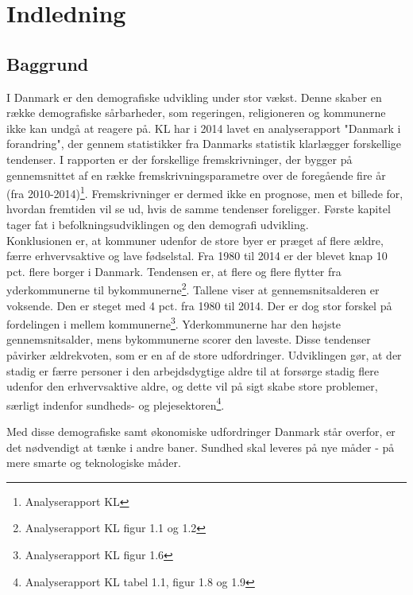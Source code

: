 \chapter{Indledning}

\section{Baggrund}
I Danmark er den demografiske udvikling under stor vækst. Denne skaber en række demografiske sårbarheder, som regeringen, religioneren og kommunerne ikke kan undgå at reagere på. KL har i 2014 lavet en analyserapport "Danmark i forandring", der gennem statistikker fra Danmarks statistik klarlægger forskellige tendenser. I rapporten er der forskellige fremskrivninger, der bygger på gennemsnittet af en række fremskrivningsparametre over de foregående fire år (fra 2010-2014)\footnote{Analyserapport KL}. Fremskrivninger er dermed ikke en prognose, men et billede for, hvordan fremtiden vil se ud, hvis de samme tendenser foreligger. Første kapitel tager fat i befolkningsudviklingen og den demografi udvikling. \\
Konklusionen er, at kommuner udenfor de store byer er præget af flere ældre, færre erhvervsaktive og lave fødselstal. Fra 1980 til 2014 er der blevet knap 10 pct. flere borger i Danmark. Tendensen er, at flere og flere flytter fra yderkommunerne til bykommunerne\footnote{Analyserapport KL figur 1.1 og 1.2 }. Tallene viser at gennemsnitsalderen er voksende. Den er steget med 4 pct. fra 1980 til 2014. Der er dog stor forskel på fordelingen i mellem kommunerne\footnote{Analyserapport KL figur 1.6}. Yderkommunerne har den højste gennemsnitsalder, mens bykommunerne scorer den laveste. Disse tendenser påvirker ældrekvoten, som er en af de store udfordringer. Udviklingen gør, at der stadig er færre personer i den arbejdsdygtige aldre til at forsørge stadig flere udenfor den erhvervsaktive aldre, og dette vil på sigt skabe store problemer, særligt indenfor sundheds- og plejesektoren\footnote{Analyserapport KL tabel 1.1, figur 1.8 og 1.9}. 

Med disse demografiske samt økonomiske udfordringer Danmark står overfor, er det nødvendigt at tænke i andre baner. Sundhed skal leveres på nye måder - på mere smarte og teknologiske måder.        

